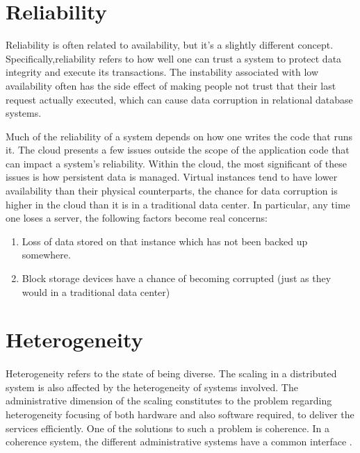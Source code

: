 \section{Reliability}

Reliability is \cite{reese_cloud_nodate} often related to availability, but it’s a slightly different concept. Specifically,reliability refers to how well one can trust a system to protect data integrity and execute its transactions. The instability associated with low availability often has the side effect of making people not trust that their last request actually executed, which can cause data corruption in relational database systems.

Much of the reliability of a system depends on how one writes the code that runs it. The cloud presents a few issues outside the scope of the application code that can impact a system’s reliability. Within the cloud, the most significant of these issues is how persistent data is managed. Virtual instances tend to have lower availability than their physical counterparts, the chance for data corruption is higher in the cloud than it is in a traditional data center. In particular, any time one loses a server, the following factors become real concerns:
\begin{enumerate}


	\item  Loss of data stored on that instance which has not been backed up somewhere.
 
 	\item   Block storage devices have a chance of becoming corrupted (just as they would in a traditional data center)
\end{enumerate}


\section{Heterogeneity}
\paragraph{}Heterogeneity refers to the state of being diverse. The scaling in a distributed system is also affected by the heterogeneity of systems involved. The administrative dimension of the scaling constitutes to the problem regarding heterogeneity focusing of both hardware and also software required, to deliver the services efficiently. One of the solutions to such a problem is coherence. In a coherence system, the different administrative systems have a common interface \cite{ord1994scale}.

